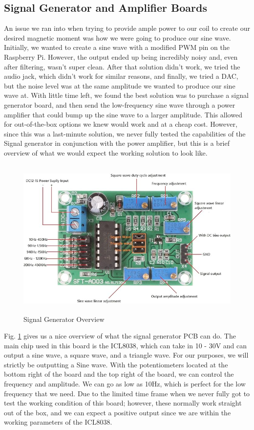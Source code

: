 \subsection{Signal Generator and Amplifier Boards}
An issue we ran into when trying to provide ample power to our coil to create our desired magnetic moment was how we were going to produce our sine wave. Initially, we wanted to create a sine wave with a modified PWM pin on the Raspberry Pi. However, the output ended up being incredibly noisy and, even after filtering, wasn't super clean. After that solution didn't work, we tried the audio jack, which didn't work for similar reasons, and finally, we tried a DAC, but the noise level was at the same amplitude we wanted to produce our sine wave at. With little time left, we found the best solution was to purchase a signal generator board, and then send the low-frequency sine wave through a power amplifier that could bump up the sine wave to a larger amplitude. This allowed for out-of-the-box options we knew would work and at a cheap cost. However, since this was a last-minute solution, we never fully tested the capabilities of the Signal generator in conjunction with the power amplifier, but this is a brief overview of what we would expect the working solution to look like.
\begin{figure}[H]
    \centering
    \includegraphics[height=8cm]{Signal Generator.jpg}
    \caption{Signal Generator Overview}
    \label{fig:Signal Generator}
\end{figure}
Fig. \ref{fig:Signal Generator} gives us a nice overview of what the signal generator PCB can do. The main chip used in this board is the ICL8038, which can take in 10 - 30V and can output a sine wave, a square wave, and a triangle wave. For our purposes, we will strictly be outputting a Sine wave. With the potentiometers located at the bottom right of the board and the top right of the board, we can control the frequency and amplitude. We can go as low as 10Hz, which is perfect for the low frequency that we need. Due to the limited time frame when we never fully got to test the working condition of this board; however, these normally work straight out of the box, and we can expect a positive output since we are within the working parameters of the ICL8038.

